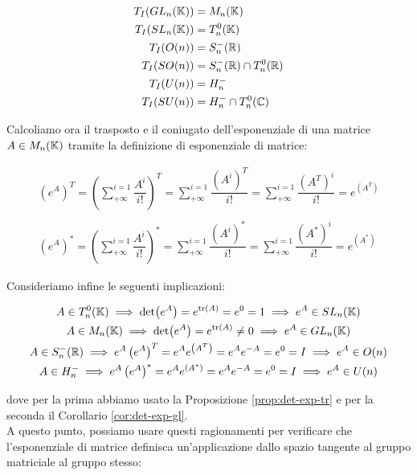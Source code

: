 \begin{align}
	T_{I}(GL_{n}(\mathbb{K})) &= M_{n}(\mathbb{K}) \\
	T_{I}(SL_{n}(\mathbb{K})) &= T^{0}_{n}(\mathbb{K}) \\
	T_{I}(O(n)) &= S^{-}_{n}(\mathbb{R}) \\
	T_{I}(SO(n)) &= S^{-}_{n}(\mathbb{R}) \cap T^{0}_{n}(\mathbb{R}) \\
	T_{I}(U(n)) &= H^{-}_{n} \\
	T_{I}(SU(n)) &= H^{-}_{n} \cap T^{0}_{n}(\mathbb{C})
\end{align}

Calcoliamo ora il trasposto e il coniugato dell'esponenziale di una matrice $ A \in M_{n}(\mathbb{K}) $ tramite la definizione di esponenziale di matrice:

\begin{gather}
	\left( e^{A} \right)^{T} = \left( \sum_{+ \infty}^{i=1} \dfrac{A^{i}}{i !} \right)^{T} %
	= \sum_{+ \infty}^{i=1} \dfrac{(A^{i})^{T}}{i !} %
	= \sum_{+ \infty}^{i=1} \dfrac{\left( A^{T} \right)^{i}}{i !} %
	= e^{\left( A^{T} \right)} \\
	\nonumber \\
	\left( e^{A} \right)^{*} = \left( \sum_{+ \infty}^{i=1} \dfrac{A^{i}}{i !} \right)^{*} %
	= \sum_{+ \infty}^{i=1} \dfrac{(A^{i})^{*}}{i !} %
	= \sum_{+ \infty}^{i=1} \dfrac{\left( A^{*} \right)^{i}}{i !} %
	= e^{\left( A^{*} \right)}
\end{gather}

Consideriamo infine le seguenti implicazioni:

\begin{gather}
	A \in T^{0}_{n}(\K) %
	\implies \det(e^{A}) = e^{\tr(A)} = e^{0} = 1 %
	\implies e^{A} \in SL_{n}(\K) \\
	A \in M_{n}(\K) %
	\implies \det(e^{A}) = e^{\tr(A)} \neq 0 %
	\implies e^{A} \in GL_{n}(\K) \\
	A \in S^{-}_{n}(\R) %
	\implies e^{A} \left( e^{A} \right)^{T} = e^{A} e^{\left( A^{T} \right)} = e^{A} e^{-A} = e^{0} = I %
	\implies e^{A} \in O(n) \\
	A \in H^{-}_{n} %
	\implies e^{A} \left( e^{A} \right)^{*} = e^{A} e^{\left( A^{*} \right)} = e^{A} e^{-A} = e^{0} = I %
	\implies e^{A} \in U(n)
\end{gather}

dove per la prima abbiamo usato la Proposizione \ref{prop:det-exp-tr} e per la seconda il Corollario \ref{cor:det-exp-gl}.\\
A questo punto, possiamo usare questi ragionamenti per verificare che l'esponenziale di matrice definisca un'applicazione dallo spazio tangente al gruppo matriciale al gruppo stesso:

